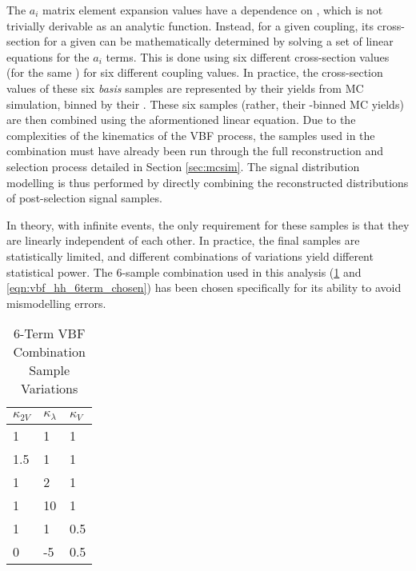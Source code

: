     The $a_i$ matrix element expansion values have a dependence on \mhh, which is not trivially derivable as an analytic function.
    Instead, for a given coupling, its cross-section for a given \mhh can be mathematically determined by solving a set of linear equations for the $a_i$ terms.
    This is done using six different cross-section values (for the same \mhh) for six different coupling values.
    In practice, the cross-section values of these six \textit{basis} samples are represented by their yields from MC simulation, binned by their \mhh.
    These six samples (rather, their \mhh-binned MC yields) are then combined using the aformentioned linear equation.
    Due to the complexities of the kinematics of the VBF process,
        the samples used in the combination must have already been run through the full reconstruction and selection process detailed in Section \ref{sec:mcsim}.
    The signal distribution modelling is thus performed by directly combining the reconstructed \mhh distributions of post-selection signal samples.

    In theory, with infinite events, the only requirement for these samples is that they are linearly independent of each other.
    In practice, the final samples are statistically limited, and different combinations of variations yield different statistical power.
    The 6-sample combination used in this analysis (\ref{tab:vbf_hh_6term_varlist} and \ref{eqn:vbf_hh_6term_chosen}) has been chosen specifically for its ability to avoid mismodelling errors.

    \begin{table}[] \centering
    \caption{6-Term VBF Combination Sample Variations}
    \label{tab:vbf_hh_6term_varlist}
    \begin{tabular}{ |l|l|l| }
        \hline
        \textbf {$\kappa_{2V}$} & \textbf {$\kappa_\lambda$} & \textbf {$\kappa_V$} \\
        \hline
            1   &   1 & 1   \\
            1.5 &   1 & 1   \\
            1   &   2 & 1   \\
            1   &  10 & 1   \\
            1   &   1 & 0.5 \\
            0   &  -5 & 0.5 \\
        \hline
    \end{tabular} \end{table}

